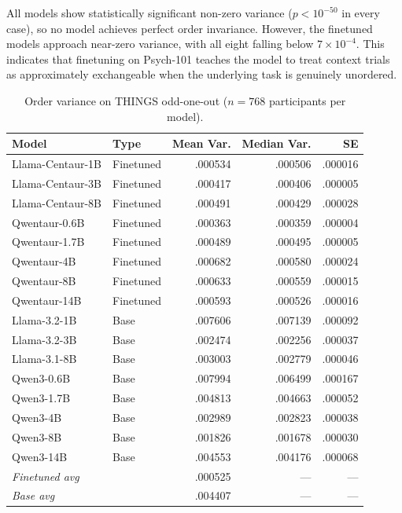 \documentclass[11pt]{article}
\begin{document}
All models show statistically significant non-zero variance ($p < 10^{-50}$ in every case), so no model achieves perfect order invariance.
However, the finetuned models approach near-zero variance, with all eight falling below $7 \times 10^{-4}$.
This indicates that finetuning on Psych-101 teaches the model to treat context trials as approximately exchangeable when the underlying task is genuinely unordered.

\begin{table}[ht]
\centering
\caption{Order variance on THINGS odd-one-out ($n = 768$ participants per model).}
\label{tab:hebart}
\small
\begin{tabular}{llrrr}
\toprule
Model & Type & Mean Var. & Median Var. & SE \\
\midrule
Llama-Centaur-1B  & Finetuned & .000534 & .000506 & .000016 \\
Llama-Centaur-3B  & Finetuned & .000417 & .000406 & .000005 \\
Llama-Centaur-8B  & Finetuned & .000491 & .000429 & .000028 \\
Qwentaur-0.6B     & Finetuned & .000363 & .000359 & .000004 \\
Qwentaur-1.7B     & Finetuned & .000489 & .000495 & .000005 \\
Qwentaur-4B       & Finetuned & .000682 & .000580 & .000024 \\
Qwentaur-8B       & Finetuned & .000633 & .000559 & .000015 \\
Qwentaur-14B      & Finetuned & .000593 & .000526 & .000016 \\
\midrule
Llama-3.2-1B      & Base      & .007606 & .007139 & .000092 \\
Llama-3.2-3B      & Base      & .002474 & .002256 & .000037 \\
Llama-3.1-8B      & Base      & .003003 & .002779 & .000046 \\
Qwen3-0.6B        & Base      & .007994 & .006499 & .000167 \\
Qwen3-1.7B        & Base      & .004813 & .004663 & .000052 \\
Qwen3-4B          & Base      & .002989 & .002823 & .000038 \\
Qwen3-8B          & Base      & .001826 & .001678 & .000030 \\
Qwen3-14B         & Base      & .004553 & .004176 & .000068 \\
\midrule
\multicolumn{2}{l}{\textit{Finetuned avg}} & .000525 & --- & --- \\
\multicolumn{2}{l}{\textit{Base avg}}      & .004407 & --- & --- \\
\bottomrule
\end{tabular}
\end{table}
\end{document}
